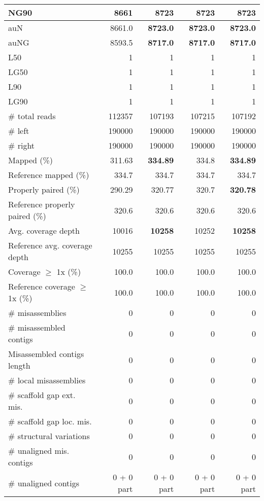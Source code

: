 \documentclass[12pt,a4paper]{article}
\begin{document}
\begin{table}[ht]
\begin{center}
\begin{tabular}{|l*{4}{|r}|}
NG90 & 8661 & {\bf 8723} & {\bf 8723} & {\bf 8723} \\ \hline
auN & 8661.0 & {\bf 8723.0} & {\bf 8723.0} & {\bf 8723.0} \\ \hline
auNG & 8593.5 & {\bf 8717.0} & {\bf 8717.0} & {\bf 8717.0} \\ \hline
L50 & 1 & 1 & 1 & 1 \\ \hline
LG50 & 1 & 1 & 1 & 1 \\ \hline
L90 & 1 & 1 & 1 & 1 \\ \hline
LG90 & 1 & 1 & 1 & 1 \\ \hline
\# total reads & 112357 & 107193 & 107215 & 107192 \\ \hline
\# left & 190000 & 190000 & 190000 & 190000 \\ \hline
\# right & 190000 & 190000 & 190000 & 190000 \\ \hline
Mapped (\%) & 311.63 & {\bf 334.89} & 334.8 & {\bf 334.89} \\ \hline
Reference mapped (\%) & 334.7 & 334.7 & 334.7 & 334.7 \\ \hline
Properly paired (\%) & 290.29 & 320.77 & 320.7 & {\bf 320.78} \\ \hline
Reference properly paired (\%) & 320.6 & 320.6 & 320.6 & 320.6 \\ \hline
Avg. coverage depth & 10016 & {\bf 10258} & 10252 & {\bf 10258} \\ \hline
Reference avg. coverage depth & 10255 & 10255 & 10255 & 10255 \\ \hline
Coverage $\geq$ 1x (\%) & 100.0 & 100.0 & 100.0 & 100.0 \\ \hline
Reference coverage $\geq$ 1x (\%) & 100.0 & 100.0 & 100.0 & 100.0 \\ \hline
\# misassemblies & 0 & 0 & 0 & 0 \\ \hline
\# misassembled contigs & 0 & 0 & 0 & 0 \\ \hline
Misassembled contigs length & 0 & 0 & 0 & 0 \\ \hline
\# local misassemblies & 0 & 0 & 0 & 0 \\ \hline
\# scaffold gap ext. mis. & 0 & 0 & 0 & 0 \\ \hline
\# scaffold gap loc. mis. & 0 & 0 & 0 & 0 \\ \hline
\# structural variations & 0 & 0 & 0 & 0 \\ \hline
\# unaligned mis. contigs & 0 & 0 & 0 & 0 \\ \hline
\# unaligned contigs & 0 + 0 part & 0 + 0 part & 0 + 0 part & 0 + 0 part \\ \hline

\end{tabular}
\end{center}
\end{table}
\end{document}

